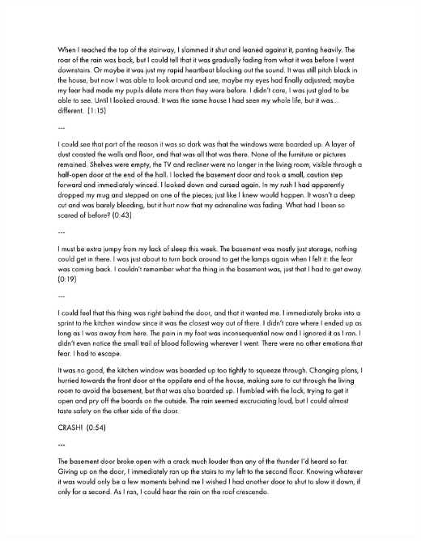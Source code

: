 \begin{center}
     \includegraphics[scale=0.75]{Scores/raindrops_Part21.pdf}
\end{center}
\newpage
